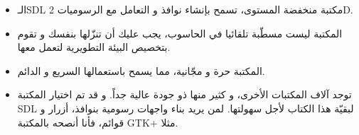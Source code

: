 \begin{itemize}
	\item الـ\textenglish{SDL}
	مكتبة منخفضة المستوى، تسمح بإنشاء نوافذ و التعامل مع الرسوميات
	\textenglish{2D}.
	\item المكتبة ليست مسطّبة تلقائيا في الحاسوب، يجب عليك أن تنزّلها بنفسك و تقوم بتخصيص البيئة التطويرية لتعمل معها.
	\item المكتبة حرة و مجّانية، مما يسمح باستعمالها السريع و الدائم.
	\item توجد آلاف المكتبات الأخرى، و كثير منها ذو جودة عالية جداً. و قد تم اختيار المكتبة 
	\textenglish{SDL}
	لبقيّة هذا الكتاب لأجل سهولتها. لمن يريد بناء واجهات رسومية بنوافذ، أزرار و قوائم، فأنا أنصحه بالمكتبة 
	\textenglish{GTK+}
	مثلا.
\end{itemize}
